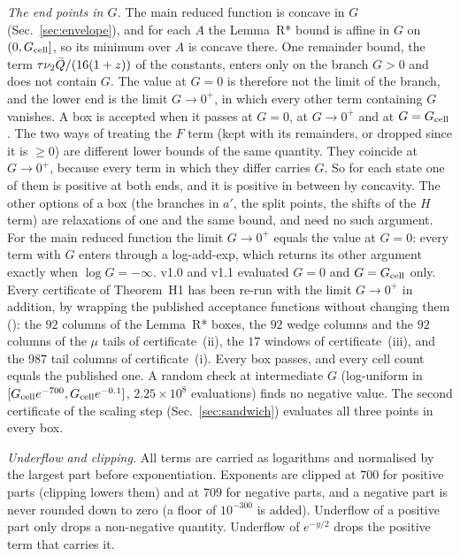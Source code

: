 \emph{The end points in $G$.}
The main reduced function is concave in $G$ (Sec.~\ref{sec:envelope}), and for each $A$ the Lemma~R* bound is affine in $G$ on $(0,G_{\rm cell}]$, so its minimum over $A$ is concave there.
One remainder bound, the term $\tau\nu_2\bar Q/(16(1+z))$ of the constants, enters only on the branch $G>0$ and does not contain $G$.
The value at $G=0$ is therefore not the limit of the branch, and the lower end is the limit $G\to0^+$, in which every other term containing $G$ vanishes.
A box is accepted when it passes at $G=0$, at $G\to0^+$ and at $G=G_{\rm cell}$.
The two ways of treating the $F$ term (kept with its remainders, or dropped since it is $\ge0$) are different lower bounds of the same quantity.
They coincide at $G\to0^+$, because every term in which they differ carries $G$.
So for each state one of them is positive at both ends, and it is positive in between by concavity.
The other options of a box (the branches in $a'$, the split points, the shifts of the $H$ term) are relaxations of one and the same bound, and need no such argument.
For the main reduced function the limit $G\to0^+$ equals the value at $G=0$: every term with $G$ enters through a log-add-exp, which returns its other argument exactly when $\log G=-\infty$.
v1.0 and v1.1 evaluated $G=0$ and $G=G_{\rm cell}$ only.
Every certificate of Theorem~H1 has been re-run with the limit $G\to0^+$ in addition, by wrapping the published acceptance functions without changing them (): the $92$ columns of the Lemma~R* boxes, the $92$ wedge columns and the $92$ columns of the $\mu$ tails of certificate~(ii), the $17$ windows of certificate~(iii), and the $987$ tail columns of certificate~(i).
Every box passes, and every cell count equals the published one.
A random check at intermediate $G$ (log-uniform in $[G_{\rm cell}e^{-700},G_{\rm cell}e^{-0.1}]$, $2.25\times10^{8}$ evaluations) finds no negative value.
The second certificate of the scaling step (Sec.~\ref{sec:sandwich}) evaluates all three points in every box.

\emph{Underflow and clipping.}
All terms are carried as logarithms and normalised by the largest part before exponentiation.
Exponents are clipped at $700$ for positive parts (clipping lowers them) and at $709$ for negative parts, and a negative part is never rounded down to zero (a floor of $10^{-300}$ is added).
Underflow of a positive part only drops a non-negative quantity.
Underflow of $e^{-y/2}$ drops the positive term that carries it.

